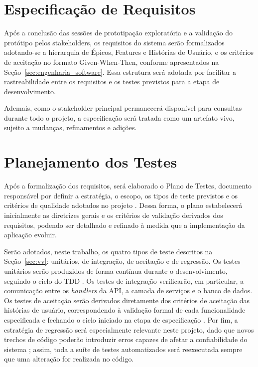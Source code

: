 \section{Especificação de Requisitos}

Após a conclusão das sessões de prototipação exploratória e a validação do protótipo pelos stakeholders, os requisitos do sistema serão formalizados adotando-se a hierarquia de Épicos, Features e Histórias de Usuário, e os critérios de aceitação no formato Given-When-Then, conforme apresentados na Seção~\ref{sec:engenharia_software}. Essa estrutura será adotada por facilitar a rastreabilidade entre os requisitos e os testes previstos para a etapa de desenvolvimento.

Ademais, como o stakeholder principal permanecerá disponível para consultas durante todo o projeto, a especificação será tratada como um artefato vivo, sujeito a mudanças, refinamentos e adições.


\section{Planejamento dos Testes}

Após a formalização dos requisitos, será elaborado o {Plano de Testes}, documento responsável por definir a estratégia, o escopo, os tipos de teste previstos e os critérios de qualidade adotados no projeto \cite{ieee829}. Dessa forma, o plano estabelecerá inicialmente as diretrizes gerais e os critérios de validação derivados dos requisitos, podendo ser detalhado e refinado à medida que a implementação da aplicação evoluir.

Serão adotados, neste trabalho, os quatro tipos de teste descritos na Seção~\ref{sec:vv}: unitários, de integração, de aceitação e de regressão. Os testes unitários serão produzidos de forma contínua durante o desenvolvimento, seguindo o ciclo do TDD \cite{beck2002}. Os testes de integração verificarão, em particular, a comunicação entre os \textit{handlers} da API, a camada de serviços e o banco de dados. Os testes de aceitação serão derivados diretamente dos critérios de aceitação das histórias de usuário, correspondendo à validação formal de cada funcionalidade especificada e fechando o ciclo iniciado na etapa de especificação \cite{cohn2004, north2006}. Por fim, a estratégia de regressão será especialmente relevante neste projeto, dado que novos trechos de código poderão introduzir erros capazes de afetar a confiabilidade do sistema \cite{sommerville2019}; assim, toda a suíte de testes automatizados será reexecutada sempre que uma alteração for realizada no código.

